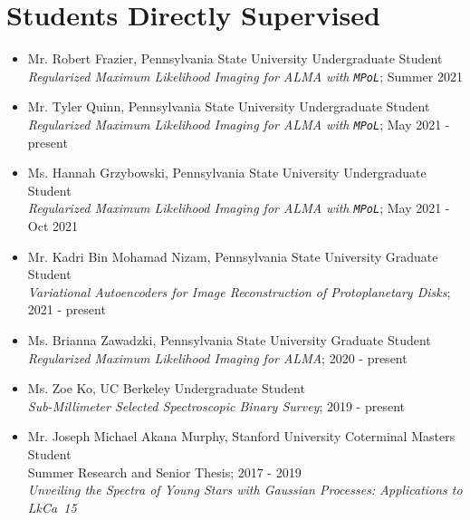 \section*{Students Directly Supervised}
\begin{itemize}
  \item Mr. Robert Frazier, Pennsylvania State University Undergraduate Student \\ 
  \emph{Regularized Maximum Likelihood Imaging for ALMA with \texttt{MPoL}}; Summer 2021
  \item Mr. Tyler Quinn, Pennsylvania State University Undergraduate Student \\ 
  \emph{Regularized Maximum Likelihood Imaging for ALMA with \texttt{MPoL}}; May 2021 - present
  \item Ms. Hannah Grzybowski, Pennsylvania State University Undergraduate Student \\ 
  \emph{Regularized Maximum Likelihood Imaging for ALMA with \texttt{MPoL}}; May 2021 - Oct 2021
  \item Mr. Kadri Bin Mohamad Nizam, Pennsylvania State University Graduate Student \\ 
  \emph{Variational Autoencoders for Image Reconstruction of Protoplanetary Disks}; 2021 - present
  \item Ms. Brianna Zawadzki, Pennsylvania State University Graduate Student \\
  \emph{Regularized Maximum Likelihood Imaging for ALMA}; 2020 - present
  \item Ms. Zoe Ko, UC Berkeley Undergraduate Student \\ 
  \emph{Sub-Millimeter Selected Spectroscopic Binary Survey}; 2019 - present 
  \item Mr. Joseph Michael Akana Murphy, Stanford University Coterminal Masters Student \\
  Summer Research and Senior Thesis; 2017 - 2019\\
  \emph{Unveiling the Spectra of Young Stars with Gaussian Processes: Applications to LkCa~15}
\end{itemize}
